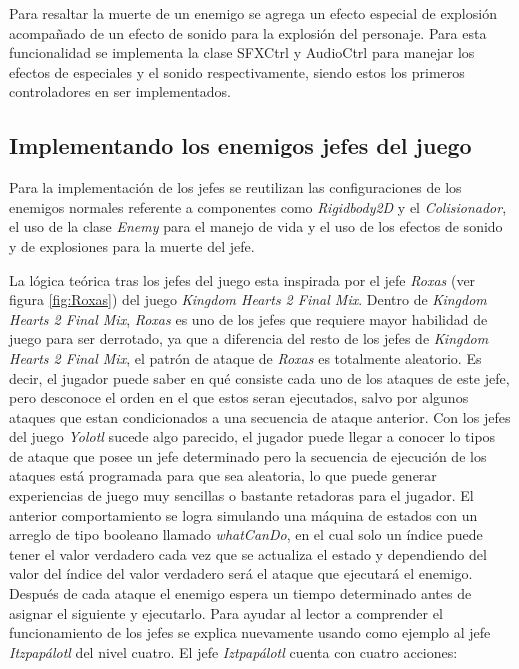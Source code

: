 Para resaltar la muerte de un enemigo se agrega un efecto especial de explosión 
acompañado de un efecto de sonido para la explosión del personaje. Para esta 
funcionalidad se implementa la clase SFXCtrl y AudioCtrl para manejar los efectos 
de especiales y el sonido respectivamente, siendo estos los primeros controladores 
en ser implementados.

\subsection{Implementando los enemigos jefes del juego}
Para la implementación de los jefes se reutilizan las configuraciones de los enemigos 
normales referente a componentes como \textit{Rigidbody2D} y el \textit{Colisionador}, 
el uso de la clase \textit{Enemy} para el manejo de vida y el uso de los efectos 
de sonido y de explosiones para la muerte del jefe.
\\
\par
La lógica teórica tras los jefes del juego esta inspirada por el jefe 
\textit{Roxas} (ver figura \ref{fig:Roxas}) del juego \textit{Kingdom Hearts 2 
Final Mix}. Dentro de \textit{Kingdom Hearts 2 Final Mix}, \textit{Roxas} es uno 
de los jefes que requiere mayor habilidad de juego para ser derrotado, ya que a 
diferencia del resto de los jefes de \textit{Kingdom Hearts 2 Final Mix}, el 
patrón de ataque de \textit{Roxas} es totalmente aleatorio. Es decir, el jugador 
puede saber en qué consiste cada uno de los ataques de este jefe, pero desconoce 
el orden en el que estos seran ejecutados, salvo por algunos ataques que estan 
condicionados a una secuencia de ataque anterior.  Con los jefes del juego 
\textit{Yolotl} sucede algo parecido, el jugador puede llegar a conocer lo tipos 
de ataque que posee un jefe determinado pero la secuencia de ejecución de los 
ataques está programada para que sea aleatoria, lo que puede generar experiencias 
de juego muy sencillas o bastante retadoras para el jugador. El anterior 
comportamiento se logra simulando una máquina de estados con un arreglo de tipo 
booleano llamado \textit{whatCanDo}, en el cual solo un índice puede tener el 
valor verdadero cada vez que se actualiza el estado y dependiendo del valor del 
índice del valor verdadero será el ataque que ejecutará el enemigo. Después de 
cada ataque el enemigo espera un tiempo determinado antes de asignar el siguiente 
y ejecutarlo. Para ayudar al lector a comprender el funcionamiento de los jefes se 
explica nuevamente usando como ejemplo al jefe \textit{Itzpapálotl} del nivel 
cuatro. El jefe \textit{Iztpapálotl} cuenta con cuatro acciones:
